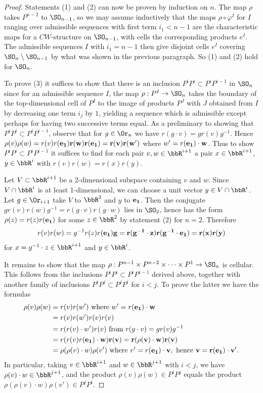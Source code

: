 \begin{proof}
    Statements (1) and (2) can now be proven by induction on $n$. The map $\rho$ takes $P^{n-2}$ to $\SO_{n-1}$, so we may assume inductively that the maps $\rho\circ\varphi^I$ for $I$ ranging over admissible sequences with first term $i_1<n-1$ are the characteristic maps for a $CW$-structure on $\SO_{n-1}$, with cells the corresponding products $e^I$. The admissible sequences $I$ with $i_1=n-1$ then give disjoint cells $e^I$ covering $\SO_n\setminus\SO_{n-1}$ by what was shown in the previous paragraph. So (1) and (2) hold for $\SO_n$.

    To prove (3) it suffices to show that there is an inclusion $P^iP^i\subset P^iP^{i-1}$ in $\SO_n$ since for an admissible sequence $I$, the map $\rho:P^I\to\SO_n$ takes the boundary of the top-dimensional cell of $P^I$ to the image of products $P^J$ with $J$ obtained from $I$ by decreasing one term $i_j$ by $1$, yielding a sequence which is admissible except perhaps for having two successive terms equal. As a preliminary to showing that $P^iP^i\subset P^iP^{i-1}$, observe that for $g\in \Or_n$ we have $r(g\cdot v)=gr(v)g^{-1}$. Hence $\rho(v)\rho(w)=r(v)r(\bf{e}_1)r(w)r(\bf{e}_1)=r(v)r(w')$ where $w'=r(\bf{e}_1)\cdot w$. Thus to show $P^iP^i\subset P^iP^{i-1}$ it suffices to find for each pair $v,w\in\bbR^{i+1}$ a pair $x\in\bbR^{i+1}$, $y\in\bbR^i$ with $r(v)r(w)=r(x)r(y)$.

    Let $V\subset \bbR^{i+1}$ be a 2-dimensional subspace containing $v$ and $w$. Since $V\cap \bbR^i$ is at least 1-dimensional, we can choose a unit vector $y\in V\cap \bbR^i$. Let $g\in\Or_{i+1}$ take $V$ to $\bbR^2$ and $y$ to $\bf{e}_1$. Then the conjugate $gr(v)r(w)g^{-1}=r(g\cdot v)r(g\cdot w)$ lies in $\SO_2$, hence has the form $\rho(z)=r(z)r(\bf{e}_1)$ for some $z\in\bbR^2$ by statement (2) for $n=2$. Therefore
    \[r(v)r(w)=g^{-1}r(z)r(\bf{e}_1)g=r(g^{-1}\cdot z)r(g^{-1}\cdot \bf{e}_1)=r(x)r(y)\]
    for $x=g^{-1}\cdot z\in\bbR^{i+1}$ and $y\in\bbR^i$.

    It remains to show that the map $\rho:P^{n-1}\times P^{n-2}\times\cdots\times P^1\to \SO_n$ is cellular. This follows from the inclusions $P^iP^i\subset P^iP^{i-1}$ derived above, together with another family of inclusions $P^iP^j\subset P^j P^i$ for $i<j$. To prove the latter we have the formulas
    \begin{align}
        \rho(v)\rho(w)&=r(v)r(w')\text{ where }w'=r(\bf{e}_1)\cdot w \notag\\
        &=r(v)r(w')r(v)r(v)\notag\\
        &=r(r(v)\cdot w')r(v)\text{ from }r(g\cdot v)=gr(v)g^{-1}\notag\\
        &=r(r(v)r(\bf{e}_1)\cdot w)r(v)=r(\rho(v)\cdot w)r(v)\notag\\
        &=\rho(\rho(v)\cdot w)\rho(v')\text{ where }v'=r(\bf{e}_1)\cdot v,\text{ hence }v=r(\bf{e}_1)\cdot v'.
    \end{align}
    In particular, taking $v\in\bbR^{i+1}$ and $w\in\bbR^{j+1}$ with $i<j$, we have $\rho(v)\cdot w\in\bbR^{j+1}$, and the product $\rho(v)\rho(w)\in P^iP^j$ equals the product $\rho(\rho(v)\cdot w)\rho(v')\in P^jP^i$.
\end{proof}


